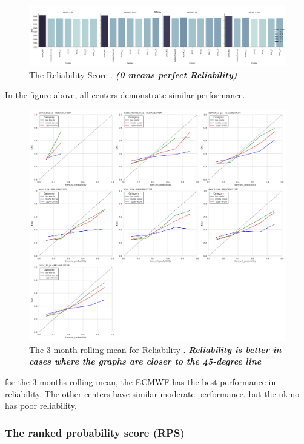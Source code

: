 \begin{figure}[H]
    \centering
    \includegraphics[scale=0.3]{rela_all.png}
    \caption{The Reliability Score  . \textbf{\textit{(0 means perfect Reliability)}}}
\end{figure}

In the figure above, all centers demonstrate similar performance.

\begin{figure}[H]
\centering
\includegraphics[scale=0.3]{rela_graphe.png}
\caption{The 3-month rolling mean for Reliability   . \textbf{\textit{Reliability is better in cases where the graphs are closer to the 45-degree line}}}
\end{figure}
for the 3-months rolling mean, the ECMWF has the best performance in reliability. The other centers have similar moderate performance, but the ukmo has poor reliability.







\subsubsection{The ranked probability score (RPS)}

